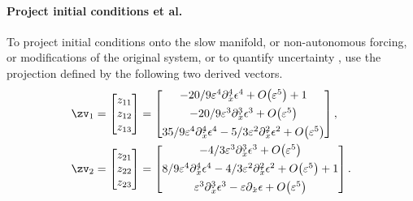 \paragraph{Project initial conditions et al.}
To project initial conditions
onto the slow manifold, or non-autonomous
forcing, or modifications of the original system, or to quantify uncertainty \cite[Ch.12]{Roberts89b, Roberts97b, Roberts2014a}, use the projection defined by the following two derived vectors.
\begin{align*}&
\zv_1=\begin{bmatrix}z_{11}\\z_{12}\\z_{13}\end{bmatrix}
=\begin{bmatrix}
{ -20/9 \eps^{4} \diff_{x}^{4} \epsilon ^{4}+O\big(\varepsilon ^{5}
\big)+1
}\\[1ex]
{ -20/9 \eps^{3} \diff_{x}^{3} \epsilon ^{3}+O\big(\varepsilon ^{5}
\big)
}\\[1ex]
{ 35/9 \eps^{4} \diff_{x}^{4} \epsilon ^{4}-5/3 \eps^{2} \diff_{x}
^{2} \epsilon ^{2}+O\big(\varepsilon ^{5}\big)
}
\end{bmatrix},
\\&
\zv_2=\begin{bmatrix}z_{21}\\z_{22}\\z_{23}\end{bmatrix}
=\begin{bmatrix}
{ -4/3 \eps^{3} \diff_{x}^{3} \epsilon ^{3}+O\big(\varepsilon ^{5}
\big)
}\\[1ex]
{ 8/9 \eps^{4} \diff_{x}^{4} \epsilon ^{4}-4/3 \eps^{2} \diff_{x}^{
2} \epsilon ^{2}+O\big(\varepsilon ^{5}\big)+1
}\\[1ex]
{ \eps^{3} \diff_{x}^{3} \epsilon ^{3}-\eps \diff_{x} \epsilon +O
\big(\varepsilon ^{5}\big)
}
\end{bmatrix}.
\end{align*}

